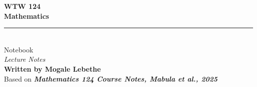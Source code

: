\begin{titlepage}

    \vspace*{4cm}

    \begin{center}
        {\Huge \bfseries WTW 124}\\[0.5cm]
        {\Huge \bfseries Mathematics}\\[1.5cm]
        
        \rule{\textwidth}{0.4pt}\\[1.5cm]

        {\Large Notebook}\\[0.5cm]
        {\normalsize \textit{Lecture Notes}}\\[1.5cm]
        {\normalsize \textbf{Written by Mogale Lebethe}}\\[0.25cm]
        {\normalsize Based on \textit{\textbf{Mathematics 124 Course Notes, Mabula et al., 2025}}}\\[3cm]
    \end{center}
\end{titlepage}

\tableofcontents

\newpage
